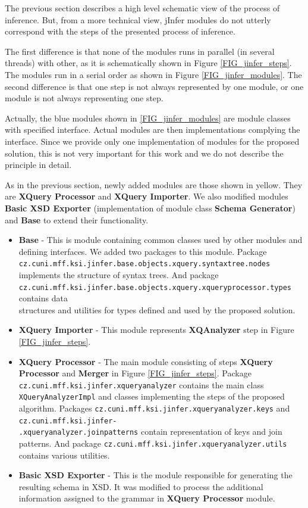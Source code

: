 The previous section describes a high level schematic view of the process of inference. But, from a more technical view, jInfer modules do not utterly correspond with the steps of the presented process of inference.

The first difference is that none of the modules runs in parallel (in several threads) with other, as it is schematically shown in Figure \ref{FIG_jinfer_steps}. The modules run in a serial order as shown in Figure \ref{FIG_jinfer_modules}. The second difference is that one step is not always represented by one module, or one module is not always representing one step.

Actually, the blue modules shown in \ref{FIG_jinfer_modules} are module classes with specified interface. Actual modules are then implementations complying the interface. Since we provide only one implementation of modules for the proposed solution, this is not very important for this work and we do not describe the principle in detail.

As in the previous section, newly added modules are those shown in yellow. They are \textbf{XQuery Processor} and \textbf{XQuery Importer}. We also modified modules \textbf{Basic XSD Exporter} (implementation of module class \textbf{Schema Generator}) and \textbf{Base} to extend their functionality.

\begin{itemize}
\item \textbf{Base} - This is module containing common classes used by other modules and defining interfaces. We added two packages to this module. Package \texttt{cz.cuni.mff.ksi.jinfer.base.objects.xquery.syntaxtree.nodes} implements the structure of syntax trees. And package \texttt{cz.cuni.mff.ksi\-.jinfer.base.objects.xquery.xqueryprocessor.types} contains data \\ structures and utilities for types defined and used by the proposed solution.
\item \textbf{XQuery Importer} - This module represents \textbf{XQAnalyzer} step in Figure \ref{FIG_jinfer_steps}.
\item \textbf{XQuery Processor} - The main module consisting of steps \textbf{XQuery Processor} and \textbf{Merger} in Figure \ref{FIG_jinfer_steps}. Package \texttt{cz.cuni.mff.ksi.jinfer\-.xqueryanalyzer} contains the main class \texttt{XQueryAnalyzerImpl} and classes implementing the steps of the proposed algorithm.  Packages \texttt{cz.cuni.mff\-.ksi.jinfer\-.xqueryanalyzer.keys} and \texttt{cz.cuni.mff.ksi.jinfer-\\.xqueryanalyzer.joinpatterns} contain representation of keys and join patterns. And package \texttt{cz.cuni.mff.ksi.jinfer\-.xqueryanalyzer.utils} contains various utilities.
\item \textbf{Basic XSD Exporter} - This is the module responsible for generating the resulting schema in XSD. It was modified to process the additional information assigned to the grammar in \textbf{XQuery Processor} module.
\end{itemize}